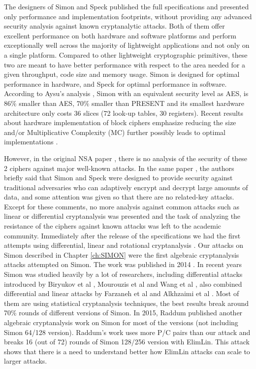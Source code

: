 The designers of Simon and Speck published the full specifications and presented
only performance and implementation footprints, without providing
any advanced security analysis
against known cryptanalytic attacks.
Both of them offer excellent performance on both
hardware and software platforms and perform
exceptionally well across the majority of lightweight applications and
not only on a single platform. Compared to
other lightweight cryptographic primitives,
these two are meant to have better performance with respect to the area
needed for a given throughput, code size and memory usage.
Simon is designed for optimal performance in hardware, and Speck for optimal
performance in software.
According to Aysu's analysis \cite{simoneff}, Simon with an equivalent security level as AES,
is $86\%$ smaller
than AES, $70\%$ smaller than PRESENT and its smallest hardware architecture
only costs 36 slices (72 look-up tables, 30 registers). Recent results about hardware
implementation of block ciphers emphasize reducing the size and/or Multiplicative Complexity (MC) further possibly
leads to optimal implementations \cite{BoyarPeraltaMCMethodAES,OptimiPaper}.

However, in the original NSA paper \cite{NSAciphers}, there is no analysis of the security of these 2 ciphers against major well-known attacks. In the same paper \cite{NSAciphers}, the authors briefly said that Simon and Speck were designed to provide security against traditional adversaries who can adaptively encrypt and decrypt large amounts of data, and some attention was given so that there are no related-key attacks. Except for these comments, no more analysis against common attacks such as linear or differential cryptanalysis was presented and the task of analyzing the resistance of the ciphers against known attacks was left to the academic community. Immediately after the release of the specifications we had the first attempts using differential, linear and rotational cryptanalysis \cite{simon1,simon2}. Our attacks on Simon described in Chapter \ref{ch:SIMON} were the first algebraic cryptanalysis attacks attempted on Simon. The work was published in 2014 \cite{courtois2014combined}. In recent years Simon was studied heavily by a lot of researchers, including differential attacks introduced by Biryukov et al \cite{simon3}, Mourouzis et al \cite{SIMON6} and Wang et al \cite{SIMON4, SIMON5}, also combined differential and linear attacks by Farzaneh et al \cite{simon1} and Alkhzaimi et al \cite{simon2}. Most of them are using statistical cryptanalysis techniques, the best results break around 70\% rounds of different versions of Simon. In 2015, Raddum \cite{raddum2006new} published another algebraic cryptanalysis work on Simon for most of the versions (not including Simon 64/128 version). Raddum's work uses more P/C pairs than our attack and breaks 16 (out of 72) rounds of Simon 128/256 version with ElimLin.  This attack shows that there is a need to understand better how ElimLin attacks can scale to larger attacks. 

